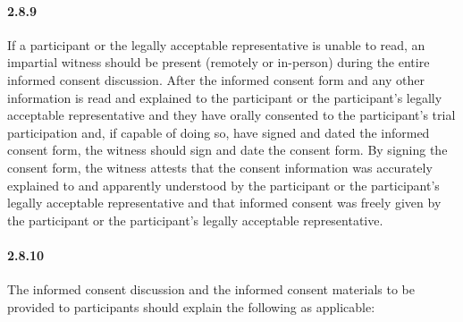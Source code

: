 \documentclass[11pt]{article}
\begin{document}
\paragraph{2.8.9} If a participant or the legally acceptable representative is unable to read, an impartial witness should be present (remotely or in-person) during the entire informed consent discussion. After the informed consent form and any other information is read and explained to the participant or the participant's legally acceptable representative and they have orally consented to the participant's trial participation and, if capable of doing so, have signed and dated the informed consent form, the witness should sign and date the consent form. By signing the consent form, the witness attests that the consent information was accurately explained to and apparently understood by the participant or the participant's legally acceptable representative and that informed consent was freely given by the participant or the participant's legally acceptable representative.

\paragraph{2.8.10} The informed consent discussion and the informed consent materials to be provided to participants should explain the following as applicable:
\end{document}
